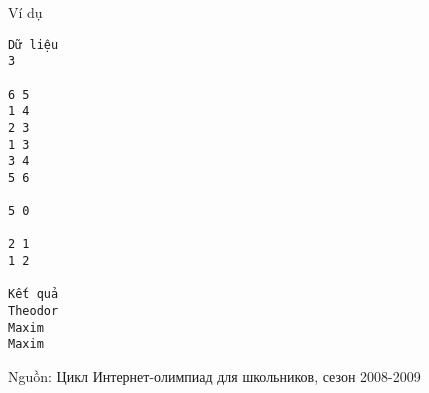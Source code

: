 Ví dụ
\begin{verbatim}
Dữ liệu
3

6 5
1 4
2 3
1 3
3 4
5 6

5 0

2 1
1 2

Kết quả
Theodor
Maxim
Maxim 
\end{verbatim}

   Nguồn: Цикл Интернет-олимпиад для школьников, сезон 2008-2009
